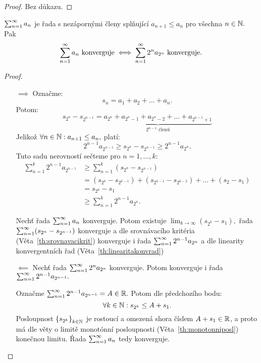 \begin{proof}
    Bez důkazu.
\end{proof}

\begin{theorem}
    \Necht $\sum_{n=1}^\infty a_n$ je řada s nezápornými členy splňující $a_{n+1} \leq a_n$
    pro všechna $n \in \mathbb{N}.$ Pak
    $$\sum_{n=1}^\infty a_n \text{ konverguje} \iff \sum_{n=1}^\infty 2^na_{2^n} \text{ konverguje}.$$
\end{theorem}

\begin{proof}
    \leavevmode
    \begin{itemize}
        \item[$\implies$]
            Označme:
            $$s_n = a_1 + a_2 + \dots + a_n.$$
            Potom:
            $$s_{2^n} - s_{2^{n-1}} = \underbrace{a_{2^n} + a_{2^n -1} 
                + a_{2^n-2} + \dots + a_{2^{n-1}+1}}_{2^{n-1} \text{ členů}}$$
            Jelikož $\forall n \in \mathbb{N}: a_{n+1} \leq a_n,$ platí:
            $$ 2^{n-1}a_{2^{n-1}} \geq s_{2^n} - s_{2^{n-1}} \geq 2^{n-1}a_{2^n}.$$
            Tuto sadu nerovností sečteme pro $n=1,\dots,k:$
            \begin{align*}
                \sum_{n=1}^k 2^{n-1}a_{2^{n-1}}
                &\geq \sum_{n=1}^k (s_{2^n}-s_{2^{n-1}}) \\
                &= (s_{2^k} - s_{2^{k-1}}) + (s_{2^{k-1}} - s_{2^{k-2}})
                    + \dots + (s_2 - s_1) \\
                &= s_{2^k} - s_1 \\
                &\geq \sum_{n=1}^k 2^{n-1}a_{2^n}.
            \end{align*}

            Nechť řada $\sum_{n=1}^\infty a_n$ konverguje. Potom existuje $\lim_{k \to \infty}
            (s_{2^k} - s_1),$ řada $\sum_{n=1}^\infty (s_{2^n} - s_{2^{n-1}})$ konverguje
            a dle srovnávacího kritéria (Věta~\ref{th:srovnavacikrit}) konverguje
            i řada $\sum_{n=1}^\infty 2^{n-1}a_{2^n}$ a dle linearity konvergentních řad
            (Věta~\ref{th:linearitakonvrad})

        \item[$\impliedby$] Nechť řada $\sum_{n=1}^\infty 2^na_{2^n}$ konverguje. Potom
            konverguje i řada $\sum_{n=1}^\infty 2^{n-1}a_{2^{n-1}}.$

            Označme $\sum_{n=1}^\infty 2^{n-1}a_{2^{n-1}} = A \in \mathbb{R}.$ Potom dle předchozího bodu:
            $$\forall k \in \mathbb{N}: s_{2^k} \leq A + s_1.$$
            Posloupnost $\left\{s_{2^k}\right\}_{k \in \mathbb{N}}$ je rostoucí a omezená shora 
            číslem $A + s_1 \in \mathbb{R}$, 
            a proto má dle věty o limitě monotónní posloupnosti 
            (Věta~\ref{th:monotonniposl}) konečnou limitu. Řada $\sum_{n=1}^\infty a_n$ 
            tedy konverguje.
    \end{itemize}
\end{proof}

